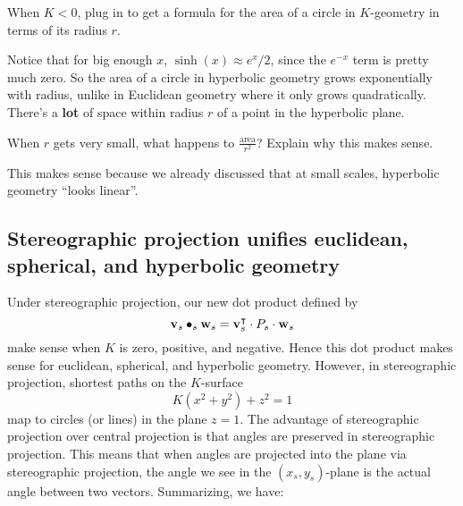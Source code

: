 \documentclass[newpage,hints,handout]{ximera}
\begin{document}
\begin{problem}
  When $K<0$, plug in to get a formula for the area of a circle in $K$-geometry
  in terms of its radius $r$.
\end{problem}

Notice that for big enough $x$, $\sinh(x) \approx e^x/2$, since the $e^{-x}$ term
is pretty much zero.  So the area of a circle in hyperbolic geometry grows
exponentially with radius, unlike in Euclidean geometry where it only grows
quadratically.  There's a \textbf{lot} of space within radius $r$ of a point in
the hyperbolic plane.


\begin{problem}
  When $r$ gets very small, what happens to $\frac{\text{area}}{r^2}$?  Explain
  why this makes sense.
  \begin{freeResponse}
    This makes sense because we already discussed that at small scales,
    hyperbolic geometry ``looks linear''.
  \end{freeResponse}
\end{problem}

\subsection{Stereographic projection unifies euclidean, spherical, and hyperbolic geometry}


Under stereographic projection, our new dot product defined by
\[
\mathbf{v}_s\bullet_s \mathbf{w}_s = \mathbf{v}_s^\intercal \cdot P_s \cdot \mathbf{w}_s
\]
make sense when $K$ is zero, positive, and negative. Hence this dot
product makes sense for euclidean, spherical, and hyperbolic
geometry. However, in stereographic projection, shortest paths on the
$K$-surface
\[
K(x^2 + y^2) + z^2 = 1
\]
map to circles (or lines) in the plane $z=1$. The advantage of
stereographic projection over central projection is that angles are
preserved in stereographic projection. This means that when angles are
projected into the plane via stereographic projection, the angle we
see in the $(x_s,y_s)$-plane is the actual angle between two
vectors. Summarizing, we have:
\end{document}

